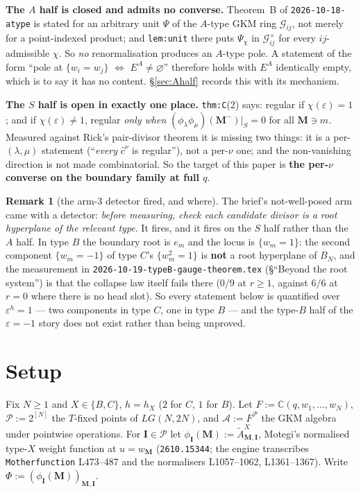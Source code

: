 \documentclass[11pt]{article}
\theoremstyle{definition}
\newtheorem{rem}[thm]{Remark}
\newcommand{\At}{\widetilde{A}}
\newcommand{\bM}{\mathbf{M}}
\newcommand{\bI}{\mathbf{I}}
\begin{document}
\textbf{The $A$ half is closed and admits no converse.}  Theorem~B of
\texttt{2026-10-18-atype} is stated for an arbitrary unit $\Psi$ of the $A$-type
GKM ring $\mathcal{G}_{ij}$, not merely for a point-indexed product; and
\texttt{lem:unit} there puts $\Psi_\chi$ in $\mathcal{G}_{ij}^{\times}$ for every
$ij$-admissible $\chi$.  So \emph{no} renormalisation produces an $A$-type pole.
A statement of the form ``pole at $\{w_i=w_j\}$ $\iff$ $E^{A}\ne\varnothing$''
therefore holds with $E^{A}$ identically empty, which is to say it has no
content.  \S\ref{sec:Ahalf} records this with its mechanism.

\textbf{The $S$ half is open in exactly one place.}  \texttt{thm:C}(2) says:
regular if $\chi(\varepsilon)=1$; and if $\chi(\varepsilon)\ne1$, regular
\emph{only when} $(\phi_\lambda\phi_\mu)(\bM^{-})|_{S}=0$ for all $\bM\ni m$.
Measured against Rick's pair-divisor theorem it is missing two things: it is a
per-$(\lambda,\mu)$ statement (``\emph{every} $\hat c^{\nu}$ is regular''), not a
per-$\nu$ one; and the non-vanishing direction is not made combinatorial.  So the
target of this paper is \textbf{the per-$\nu$ converse on the boundary family at
full $q$}.

\begin{rem}[the arm-3 detector fired, and where]
The brief's not-well-posed arm came with a detector: \emph{before measuring,
check each candidate divisor is a root hyperplane of the relevant type}.  It
fires, and it fires on the $S$ half rather than the $A$ half.  In type $B$ the
boundary root is $e_m$ and the locus is $\{w_m=1\}$: the second component
$\{w_m=-1\}$ of type $C$'s $\{w_m^{2}=1\}$ is \textbf{not} a root hyperplane of
$B_N$, and the measurement in \texttt{2026-10-19-typeB-gauge-theorem.tex}
(\S``Beyond the root system'') is that the collapse law itself fails there
($0/9$ at $r\ge1$, against $6/6$ at $r=0$ where there is no head slot).  So
every statement below is quantified over $\varepsilon^{h}=1$ --- two components
in type $C$, one in type $B$ --- and the type-$B$ half of the $\varepsilon=-1$
story does not exist rather than being unproved.
\end{rem}

\section{Setup}
\label{sec:setup}

Fix $N\ge1$ and $X\in\{B,C\}$, $h=h_X$ ($2$ for $C$, $1$ for $B$).  Let
$F:=\mathbb{C}(q,w_1,\dots,w_N)$, $\mathcal{P}:=2^{[N]}$ the $T$-fixed points of
$LG(N,2N)$, and $\mathcal{A}:=F^{\mathcal{P}}$ the GKM algebra under pointwise
operations.  For $\bI\in\mathcal{P}$ let
$\phi_{\bI}(\bM):=\At^{X}_{\bM,\bI}$, Motegi's normalised type-$X$ weight
function at $u=w_{\bM}$ (\texttt{2610.15344}; the engine transcribes
\texttt{Motherfunction} L473--487 and the normalisers L1057--1062, L1361--1367).
Write $\Phi:=(\phi_{\bI}(\bM))_{\bM,\bI}$.
\end{document}
